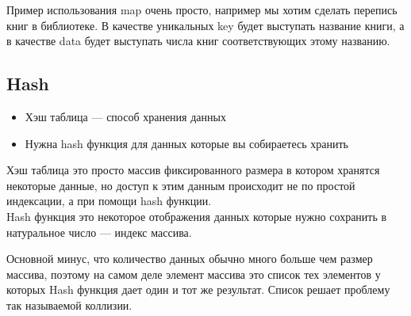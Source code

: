 Пример использования map очень просто, например мы хотим сделать перепись книг в библиотеке. В качестве уникальных key будет выступать название книги, а в качестве data будет выступать числа книг соответствующих этому названию.

\subsection{Hash}
\begin{itemize}
	\item Хэш таблица --- способ хранения данных
	\item Нужна hash функция для данных которые вы собираетесь хранить
\end{itemize}

Хэш таблица это просто массив фиксированного размера в котором хранятся некоторые данные, но доступ к этим данным происходит не по простой индексации, а при помощи hash функции.\\

Hash функция это некоторое отображения данных которые нужно сохранить в натуральное число --- индекс массива.

Основной минус, что количество данных обычно много больше чем размер массива, поэтому на самом деле элемент массива это список тех элементов у которых Hash функция дает один и тот же результат. Список решает проблему так называемой коллизии.
